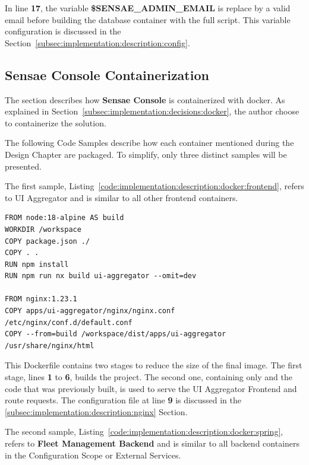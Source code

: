 In line \textbf{17}, the variable \textbf{\$SENSAE\_ADMIN\_EMAIL} is replace by a valid email before building the database container with the full script. This variable configuration is discussed in the Section~\ref{subsec:implementation:description:config}.

\subsection{Sensae Console Containerization}
\label{subsec:implementation:description:docker}

The section describes how \textbf{Sensae Console} is containerized with docker.
As explained in Section~\ref{subsec:implementation:decisions:docker}, the author choose to containerize the solution.

The following Code Samples describe how each container mentioned during the Design Chapter are packaged. To simplify, only three distinct samples will be presented.

The first sample, Listing~\ref{code:implementation:description:docker:frontend}, refers to UI Aggregator and is similar to all other frontend containers.

\begin{lstlisting}[caption=Dockerfile for UI Aggregator Frontend, label={code:implementation:description:docker:frontend}]
FROM node:18-alpine AS build
WORKDIR /workspace
COPY package.json ./
COPY . .
RUN npm install
RUN npm run nx build ui-aggregator --omit=dev

FROM nginx:1.23.1
COPY apps/ui-aggregator/nginx/nginx.conf /etc/nginx/conf.d/default.conf
COPY --from=build /workspace/dist/apps/ui-aggregator /usr/share/nginx/html
\end{lstlisting}

This Dockerfile contains two stages to reduce the size of the final image. The first stage, lines \textbf{1} to \textbf{6}, builds the project. The second one, containing only  and the code that was previously built, is used to serve the UI Aggregator Frontend and route requests. The  configuration file at line \textbf{9} is discussed in the \ref{subsec:implementation:description:nginx} Section.

The second sample, Listing~\ref{code:implementation:description:docker:spring}, refers to \textbf{Fleet Management Backend} and is similar to all backend containers in the Configuration Scope or External Services.

